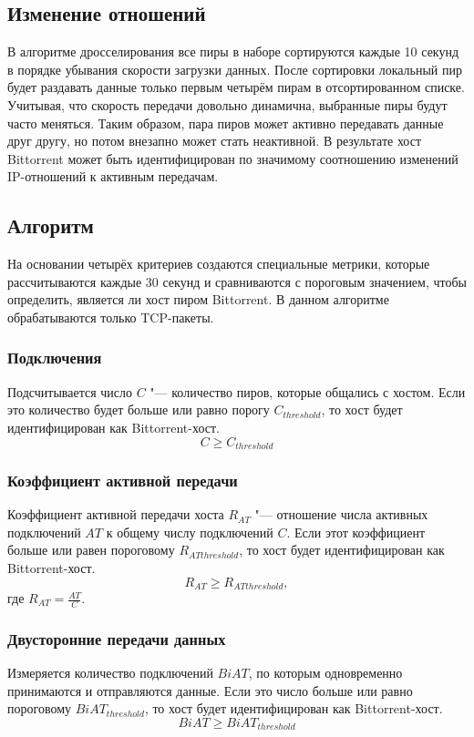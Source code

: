 \documentclass[bachelor, och, coursework]{SCWorks}
\begin{document}
\subsection{Изменение отношений}
В алгоритме дросселирования все пиры в наборе сортируются каждые 10 секунд в порядке убывания скорости загрузки данных.
После сортировки локальный пир будет раздавать данные только первым четырём пирам в отсортированном списке.
Учитывая, что скорость передачи довольно динамична, выбранные пиры будут часто меняться. Таким образом, пара пиров
может активно передавать данные друг другу, но потом внезапно может стать неактивной. В результате хост Bittorrent может
быть идентифицирован по значимому соотношению изменений IP-отношений к активным передачам.

\subsection{Алгоритм}
На основании четырёх критериев создаются специальные метрики, которые рассчитываются каждые 30 секунд
и сравниваются с пороговым значением, чтобы определить, является ли хост пиром Bittorrent. В данном алгоритме
обрабатываются только TCP-пакеты. 

\subsubsection{Подключения}
Подсчитывается число $C$ "--- количество пиров, которые общались с хостом. Если это количество будет больше или равно порогу $C_{threshold}$, то хост будет идентифицирован как Bittorrent-хост.
\[ C \geq C_{threshold} \]

\subsubsection{Коэффициент активной передачи}
Коэффициент активной передачи хоста $R_{AT}$ "--- отношение числа активных подключений $AT$ к общему числу подключений $C$.
Если этот коэффициент больше или равен пороговому $R_{ATthreshold}$, то хост будет идентифицирован как Bittorrent-хост.
\[ R_{AT} \geq R_{ATthreshold}, \]
где $R_{AT} = \frac{AT}{C}$.

\subsubsection{Двусторонние передачи данных}
Измеряется количество подключений $BiAT$, по которым одновременно принимаются и отправляются данные. 
Если это число больше или равно пороговому $BiAT_{threshold}$, то хост будет идентифицирован как Bittorrent-хост.
\[ BiAT \geq BiAT_{threshold} \]
\end{document}

